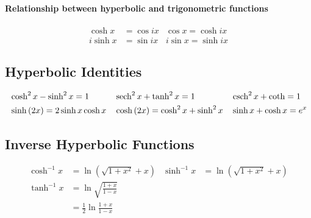 \paragraph{Relationship between hyperbolic and trigonometric functions}
\begin{align*}
\cosh x &= \cos{ix} & \cos x = \cosh{ix} \\
i\sinh x &= \sin{ix} & i\sin{x} = \sinh{ix}
\end{align*}

\subsection{Hyperbolic Identities}
\begin{align*}
&\cosh^2 x - \sinh^2 x = 1 & &\operatorname{sech}^2x + \tanh^2x = 1 & &\operatorname{csch}^2x + \coth = 1\\
&\sinh{(2x)} = 2\sinh x\cosh x & &\cosh{(2x)} = \cosh^2x + \sinh^2{x} & &\sinh x + \cosh x = e^x \\
\end{align*}

\subsection{Inverse Hyperbolic Functions}
\begin{align*}
\cosh^{-1}x &= \ln{(\sqrt{1 + x^2} + x)} & \sinh^{-1}x &= \ln{(\sqrt{1 + x^2} + x)} \\
\tanh^{-1}x &= \ln{\sqrt{\frac{1 + x}{1 - x}}} \\
&= \frac{1}{2}\ln{\frac{1+x}{1-x}}
\end{align*}
